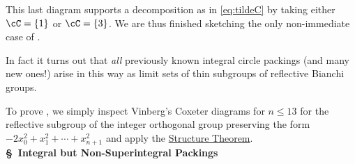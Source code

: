 \documentclass[12pt,reqno]{amsart}
\newcommand{\StructThm}{\hyperref[thm:tildeC]{Structure Theorem}}
\begin{document}
\noindent
This last diagram
 supports a decomposition
 as in \eqref{eq:tildeC}  by taking either $\cC=\{1\}$ or $\cC=\{3\}$. We are thus finished sketching  the only non-immediate case of .


\begin{rmk}
In fact it turns out that {\it all} previously known integral circle packings (and many new ones!) arise in this way as limit sets of thin subgroups of reflective Bianchi groups.
\end{rmk}


To prove ,
we simply
inspect
 Vinberg's Coxeter diagrams \cite{Vinberg1972} for $n\le13$ for the  reflective subgroup of the integer orthogonal group preserving the form $-2x_0^2+x_1^2+\cdots+x_{n+1}^2$ 
 and apply the \StructThm.
\\


\noindent
{\bf \S\ Integral but Non-Superintegral Packings}\
\end{document}
